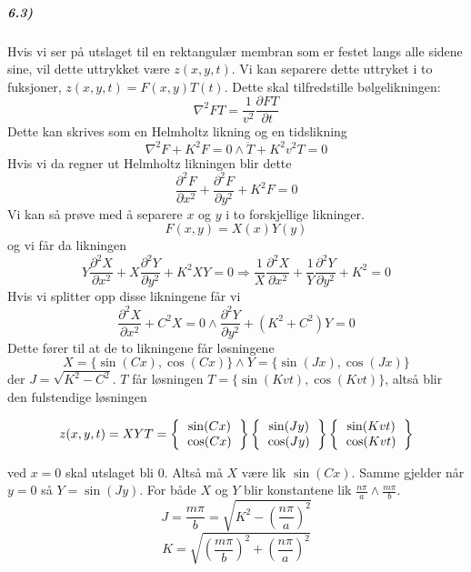 \documentclass[11pt, A4paper,norsk]{article}
\begin{document}
			\subparagraph{6.3)}
				\begin{flushleft}
Hvis vi ser på utslaget til en rektangulær membran som er festet langs alle sidene sine, vil dette uttrykket være $z(x, y, t)$. Vi kan separere dette uttryket i to fuksjoner, $z(x, y, t) = F(x, y)T(t)$. Dette skal tilfredstille bølgelikningen:
$$\nabla^2 F T = \frac{1}{v^2} \frac{\partial F T}{\partial t}$$
Dette kan skrives som en Helmholtz likning og en tidslikning
$$\nabla^2 F + K^2 F = 0 \wedge \ddot{T} + K^2 v^2 T = 0$$
Hvis vi da regner ut Helmholtz likningen blir dette
$$\frac{\partial^2 F}{\partial x^2} + \frac{\partial^2 F}{\partial y^2} + K^2 F = 0$$
Vi kan så prøve med å separere $x$ og $y$ i to forskjellige likninger.
$$F(x, y) = X(x) Y(y)$$
og vi får da likningen
$$Y \frac{\partial^2 X}{\partial x^2} + X \frac{\partial^2 Y}{\partial y^2} + K^2 X Y = 0 \Rightarrow \frac{1}{X} \frac{\partial^2 X}{\partial x^2} + \frac{1}{Y} \frac{\partial^2 Y}{\partial y^2} + K^2 = 0$$
Hvis vi splitter opp disse likningene får vi
$$\frac{\partial^2 X}{\partial x^2} + C^2 X = 0 \wedge \frac{\partial^2 Y}{\partial y^2} + (K^2 + C^2) Y = 0$$
Dette fører til at de to likningene får løsningene
$$X = \{ \sin(C x), \cos(C x) \} \wedge Y = \{ \sin(J x), \cos(J x) \}$$
der $J = \sqrt{K^2 - C^2}$. $T$ får løsningen $T = \{ \sin(K v t), \cos(K v t) \}$, altså blir den fulstendige løsningen
				\end{flushleft}
				\begin{gather*}
z(x, y, t) = X Y T = \left\{
\begin{tabular}{ c }
$\sin(C x)$ \\
$\cos(C x)$
\end{tabular}
\right\} \left\{
\begin{tabular}{ c }
$\sin(J y)$ \\
$\cos(J y)$
\end{tabular}
\right\} \left\{
\begin{tabular}{ c }
$\sin(Kv t)$ \\
$\cos(Kv t)$
\end{tabular}
\right\}
				\end{gather*}
				\begin{flushleft}
ved $x = 0$ skal utslaget bli $0$. Altså må $X$ være lik $\sin(C x)$. Samme gjelder når $y = 0$ så $Y = \sin(J y)$. For både $X$ og $Y$ blir konstantene lik $\frac{n \pi}{a} \wedge \frac{m \pi}{b}$.
$$J = \frac{m \pi}{b} = \sqrt{K^2 - \left( \frac{n \pi}{a} \right)^2}$$
$$K = \sqrt{\left( \frac{m \pi}{b} \right)^2 + \left( \frac{n \pi}{a} \right)^2}$$
				\end{flushleft}
\end{document}
